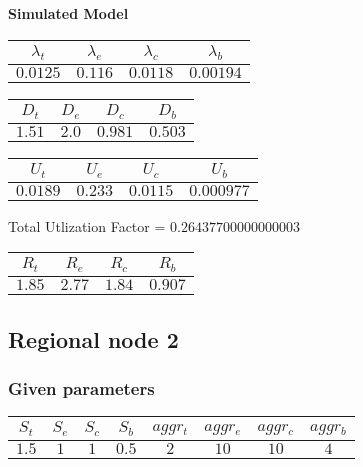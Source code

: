 \documentclass{article}
\begin{document}
\begin{minipage}{0.5\textwidth}
\centering	\textbf{Simulated Model}
\begin{table}[H]
\centering
\begin{tabular}{@{}cccc@{}}
\toprule
$\lambda_t$ & $\lambda_e$ & $\lambda_c$ & $\lambda_b$\\
\midrule
$0.0125$ & $0.116$ & $0.0118$ & $0.00194$\\
\bottomrule
\end{tabular}
\end{table}
\begin{table}[H]
\centering
\begin{tabular}{@{}cccc@{}}
\toprule
$D_t$ & $D_e$ & $D_c$ & $D_b$\\
\midrule
$1.51$ & $2.0$ & $0.981$ & $0.503$\\
\bottomrule
\end{tabular}
\end{table}\begin{table}[H]
\centering
\begin{tabular}{@{}cccc@{}}
\toprule
$U_t$ & $U_e$ & $U_c$ & $U_b$\\
\midrule
$0.0189$ & $0.233$ & $0.0115$ & $0.000977$\\
\bottomrule
\end{tabular}
\end{table}
\centering Total Utlization Factor = $0.26437700000000003$
\begin{table}[H]
\centering
\begin{tabular}{@{}cccc@{}}
\toprule
$R_t$ & $R_e$ & $R_c$ & $R_b$\\
\midrule
$1.85$ & $2.77$ & $1.84$ & $0.907$\\
\bottomrule
\end{tabular}
\end{table}
\end{minipage}
\newpage\subsection{Regional node 2}
\subsubsection{Given parameters}
\begin{table}[H]
\centering
\begin{tabular}{@{}cccc|cccc@{}}
\toprule
$S_t$ & $S_e$ & $S_c$ & $S_b$ & $aggr_t$ & $aggr_e$ & $aggr_c$ & $aggr_b$\\
\midrule
$1.5$ & $1$ & $1$ & $0.5$ & $2$ & $10$ & $10$ & $4$\\
\bottomrule
\end{tabular}
\end{table}
\end{document}

